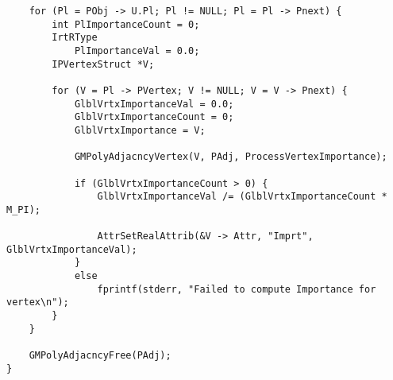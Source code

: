\begin{verbatim}
    for (Pl = PObj -> U.Pl; Pl != NULL; Pl = Pl -> Pnext) {
        int PlImportanceCount = 0;
        IrtRType
            PlImportanceVal = 0.0;
        IPVertexStruct *V;

        for (V = Pl -> PVertex; V != NULL; V = V -> Pnext) {
            GlblVrtxImportanceVal = 0.0;
            GlblVrtxImportanceCount = 0;
            GlblVrtxImportance = V;

            GMPolyAdjacncyVertex(V, PAdj, ProcessVertexImportance);

            if (GlblVrtxImportanceCount > 0) {
                GlblVrtxImportanceVal /= (GlblVrtxImportanceCount * M_PI);

                AttrSetRealAttrib(&V -> Attr, "Imprt", GlblVrtxImportanceVal);
            }
            else
                fprintf(stderr, "Failed to compute Importance for vertex\n");
        }
    }

    GMPolyAdjacncyFree(PAdj);
}
\end{verbatim}
